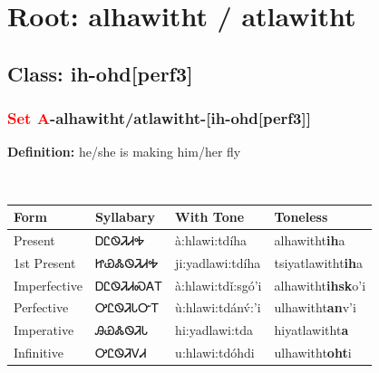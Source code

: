 \needspace{4in}
\section*{Root: alhawitht / atlawitht}
\nopagebreak
{}
\needspace{3in}
\subsection*{Class: ih-ohd[perf3]}
\nopagebreak
\needspace{2in}
\subsubsection*{\textcolor{Red}{Set A}{-}\textbf{alhawitht/atlawitht}{-}[ih-ohd[perf3]]}
\nopagebreak
\textbf{Definition: } he/she is making him/her fly
\\[0.5em]
\begin{tabularx}{\textwidth}{l X X X}%
\toprule%
\textbf{Form}&\textbf{Syllabary}&\textbf{With Tone}&\textbf{Toneless}\\%
\midrule%
Present&ᎠᏝᏫᏘᏗᎭ&à:hlawi:tdíha&alhawitht\textbf{ih}a\\%
1st Present&ᏥᏯᏜᏫᏘᏗᎭ&ji:yadlawi:tdíha&tsiyatlawitht\textbf{ih}a\\%
Imperfective&ᎠᏝᏫᏘᏗᏍᎪᎢ&à:hlawi:tdǐ:sgó’i&alhawitht\textbf{ihsk}o'i\\%
Perfective&ᎤᏝᏫᏘᏓᏅᎢ&ù:hlawi:tdánv́:’i&ulhawitht\textbf{an}v'i\\%
Imperative&ᎯᏯᏜᏫᏘᏓ&hi:yadlawi:tda&hiyatlawitht\textbf{a}\\%
Infinitive&ᎤᏝᏫᏘᏙᏗ&u:hlawi:tdóhdi&ulhawitht\textbf{oht}i\\%
\bottomrule%
\end{tabularx}
\\[1em]